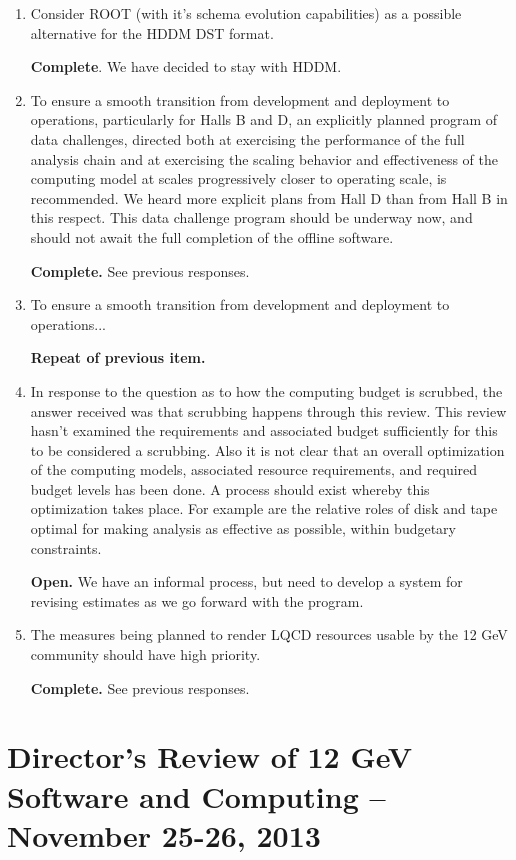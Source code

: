 \documentclass[12pt]{article}
\begin{document}
\begin{enumerate}
\item Consider ROOT (with it's schema evolution capabilities) as a
  possible alternative for the HDDM DST format.

  {\bf Complete}. We have decided to stay with HDDM.

\item To ensure a smooth transition from development and deployment to
  operations, particularly for Halls B and D, an explicitly planned
  program of data challenges, directed both at exercising the
  performance of the full analysis chain and at exercising the scaling
  behavior and effectiveness of the computing model at scales
  progressively closer to operating scale, is recommended. We heard
  more explicit plans from Hall D than from Hall B in this
  respect. This data challenge program should be underway now, and
  should not await the full completion of the offline software.

  {\bf Complete.} See previous responses.

\item To ensure a smooth transition from development and deployment to
  operations...

  {\bf Repeat of previous item.}

\item In response to the question as to how the computing budget is
  scrubbed, the answer received was that scrubbing happens through
  this review. This review hasn't examined the requirements and
  associated budget sufficiently for this to be considered a
  scrubbing. Also it is not clear that an overall optimization of the
  computing models, associated resource requirements, and required
  budget levels has been done. A process should exist whereby this
  optimization takes place. For example are the relative roles of disk
  and tape optimal for making analysis as effective as possible,
  within budgetary constraints.

  {\bf Open.} We have an informal process, but need to develop a system for revising estimates as we go forward with the program.

\item The measures being planned to render LQCD resources usable by
  the 12 GeV community should have high priority.

  {\bf Complete.} See previous responses.

\end{enumerate}

\section{Director's Review of 12 GeV Software and Computing -- November 25-26, 2013}
\end{document}
